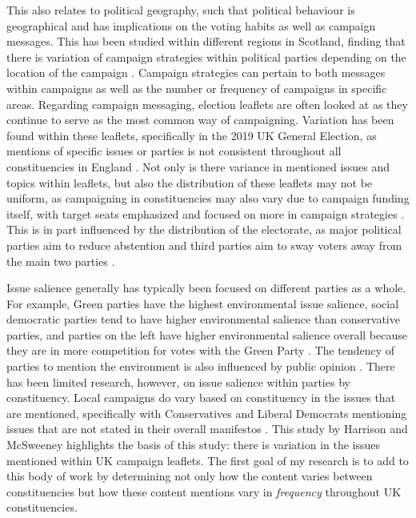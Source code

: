 \documentclass[preprint,12pt,authoryear]{elsarticle}
\begin{document}
This also relates to political geography, such that political behaviour is geographical and has implications on the voting habits as well as campaign messages. This has been studied within different regions in Scotland, finding that there is variation of campaign strategies within political parties depending on the location of the campaign \citep{pringleClassicsHumanGeography2003,agasosterPartyCohesionLocal2001}. Campaign strategies can pertain to both messages within campaigns as well as the number or frequency of campaigns in specific areas. Regarding campaign messaging, election leaflets are often looked at as they continue to serve as the most common way of campaigning. Variation has been found within these leaflets, specifically in the 2019 UK General Election, as mentions of specific issues or parties is not consistent throughout all constituencies in England  \citep{trummParliamentaryCandidatesTheir2023a}. Not only is there variance in mentioned issues and topics within leaflets, but also the distribution of these leaflets may not be uniform, as campaigning in constituencies may also vary due to campaign funding itself, with target seats emphasized and focused on more in campaign strategies \citep{pattieResourcingConstituencyCampaign2016}. This is in part influenced by the distribution of the electorate, as major political parties aim to reduce abstention and third parties aim to sway voters away from the main two parties \citep{nunezEffectsLocalCampaigning2021}.

Issue salience generally has typically been focused on different parties as a whole. For example, Green parties have the highest environmental issue salience, social democratic parties tend to have higher environmental salience than conservative parties, and parties on the left have higher environmental salience overall because they are in more competition for votes with the Green Party \citep{carterGreeningMainstreamParty2013}. The tendency of parties to mention the environment is also influenced by public opinion \citep{carterPartyPoliticizationEnvironment2006}. There has been limited research, however, on issue salience within parties by constituency. Local campaigns do vary based on constituency in the issues that are mentioned, specifically with Conservatives and Liberal Democrats mentioning issues that are not stated in their overall manifestos \citep{harrisonNationalLocalParty2008}. This study by Harrison and McSweeney highlights the basis of this study: there is variation in the issues mentioned within UK campaign leaflets. The first goal of my research is to add to this body of work by determining not only how the content varies between constituencies but how these content mentions vary in \textit{frequency} throughout UK constituencies.
\end{document}

